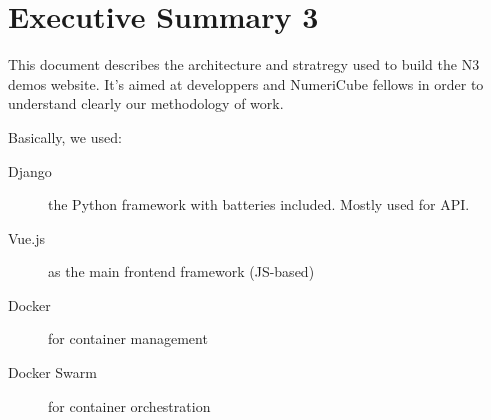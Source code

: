 
\chapter*{Executive Summary 3}
This document describes the architecture and stratregy used to build the N3 demos website.
It's aimed at developpers and NumeriCube fellows in order to understand clearly our methodology of work.

Basically, we used:
\begin{description}
\item[Django] the Python framework with batteries included. Mostly used for API.
\item[Vue.js] as the main frontend framework (JS-based)
\item[Docker] for container management
\item[Docker Swarm] for container orchestration
\end{description}

\cleardoublepage %
